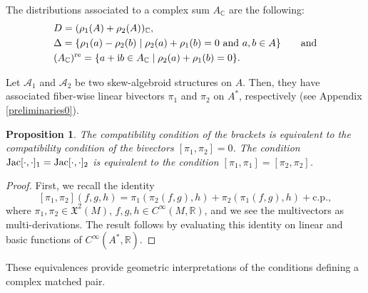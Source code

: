 \documentclass[pdftex]{sigma}
\numberwithin{equation}{section}
\newtheorem{Proposition}[Theorem]{Proposition}
 { \theoremstyle{definition}
\newtheorem{Definition}[Theorem]{Definition}
\newtheorem{Note}[Theorem]{Note}
\newtheorem{Example}[Theorem]{Example}
\newtheorem{Examples}[Theorem]{Examples}
\newtheorem{Remark}[Theorem]{Remark} }
\newcommand{\R}{{\mathbb{R}}}
\newcommand{\C}{{\mathbb{C}}}
\DeclareMathOperator{\real}{re}
\begin{document}
The distributions associated to a complex sum $A_{\C}$ are the following:
\begin{align*}
  &D=(\rho_1(A)+\rho_2(A))_{\C},\\
  &\Delta=\{\rho_1(a)-\rho_2(b)\mid \rho_2(a)+\rho_1(b)=0\ \text{and}\ a,b\in A \}\qquad\text{and}\\
  &(A_{\C})^{\real}=\{a+{\rm i}b\in A_{\C} \mid \rho_2(a)+\rho_1(b)=0\}.
\end{align*}

Let $\mathcal{A}_1$ and $\mathcal{A}_2$ be two skew-algebroid structures on $A$. Then, they have associated fiber-wise linear bivectors $\pi_1$ and $\pi_2$ on $A^*$, respectively (see Appendix \ref{preliminaries0}).
\begin{Proposition}\label{cxlinbivcxmp}
The compatibility condition of the brackets is equivalent to the compatibility condition of the bivectors $[\pi_1,\pi_2]=0$. The condition ${\rm Jac}[\cdot,\cdot]_1={\rm Jac}[\cdot,\cdot]_2$ is equivalent to the condition $[\pi_1,\pi_1]=[\pi_2,\pi_2]$.
\end{Proposition}
\begin{proof}
First, we recall the identity
 \[[\pi_1,\pi_2](f,g,h)=\pi_1(\pi_2(f,g), h)+\pi_2(\pi_1(f,g), h)+\mathrm{c.p.},\]
where $\pi_1,\pi_2\in \mathfrak{X}^2(M)$, $f,g,h\in C^{\infty}(M,\R)$, and we see the multivectors as multi-derivations. The result follows by evaluating this identity on linear and basic functions of $C^{\infty}(A^*,\R)$.
\end{proof}

These equivalences provide geometric interpretations of the conditions defining a complex matched pair.
\end{document}
